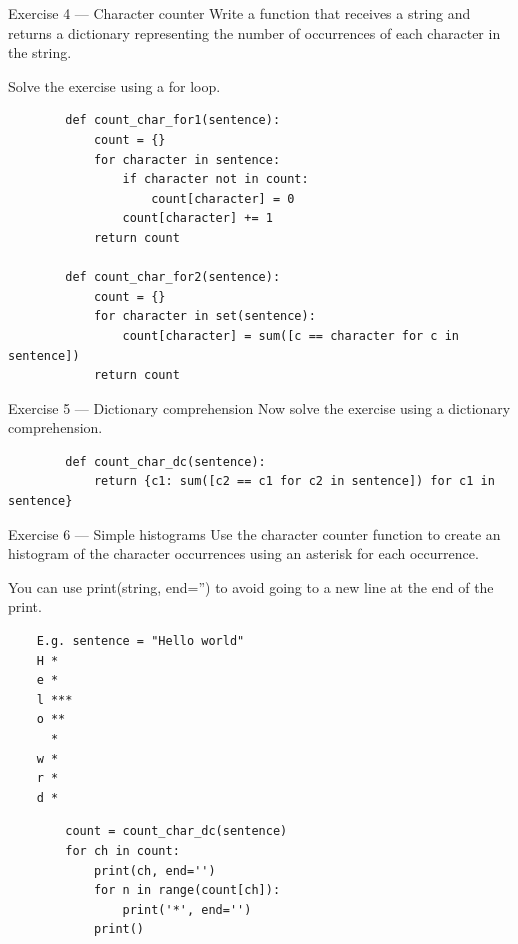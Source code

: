 \documentclass[aspectratio=169,handout]{beamer}
\begin{document}
\begin{frame}[fragile]{Exercise 4 --- Character counter}
    Write a function that receives a string and returns a dictionary representing the number of occurrences of each
    character in the string.

    Solve the exercise using a for loop.

    \pause
    \begin{verbatim}
        def count_char_for1(sentence):
            count = {}
            for character in sentence:
                if character not in count:
                    count[character] = 0
                count[character] += 1
            return count

        def count_char_for2(sentence):
            count = {}
            for character in set(sentence):
                count[character] = sum([c == character for c in sentence])
            return count
    \end{verbatim}
\end{frame}

\begin{frame}[fragile]{Exercise 5 --- Dictionary comprehension}
    Now solve the exercise using a dictionary comprehension.

    \pause
    \begin{verbatim}
        def count_char_dc(sentence):
            return {c1: sum([c2 == c1 for c2 in sentence]) for c1 in sentence}
    \end{verbatim}
\end{frame}

\begin{frame}[fragile]{Exercise 6 --- Simple histograms}
    Use the character counter function to create an histogram of the character occurrences using an asterisk for each
    occurrence.

    You can use print(string, end='') to avoid going to a new line at the end of the print.

    \begin{minipage}{0.49\textwidth}
    \begin{verbatim}
    E.g. sentence = "Hello world"
    H *
    e *
    l ***
    o **
      *
    w *
    r *
    d *
    \end{verbatim}
    \end{minipage}
    \pause
    \begin{minipage}{0.49\textwidth}
    \begin{verbatim}
        count = count_char_dc(sentence)
        for ch in count:
            print(ch, end='')
            for n in range(count[ch]):
                print('*', end='')
            print()
    \end{verbatim}
    \end{minipage}
\end{frame}
\end{document}
